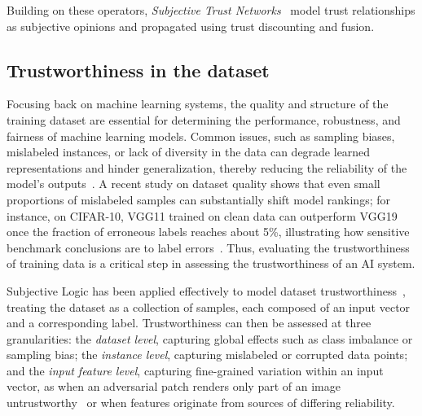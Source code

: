 Building on these operators, \emph{Subjective Trust Networks}~\cite{4622580,10.1007/978-3-032-08887-1_4} model trust relationships as subjective opinions and propagated using trust discounting and fusion. 

\vspace{-0.5em}
\subsection{Trustworthiness in the dataset}\label{sec:backtwdt}

Focusing back on machine learning systems, the quality and structure of the training dataset are essential for determining the performance, robustness, and fairness of machine learning models. Common issues, such as sampling biases, mislabeled instances, or lack of diversity in the data can degrade learned representations and hinder generalization, thereby reducing the reliability of the model’s outputs~\cite{arp2021dosdontsmachinelearning}. A recent study on dataset quality shows that even small proportions of mislabeled samples can substantially shift model rankings; for instance, on CIFAR-10, VGG11 trained on clean data can outperform VGG19 once the fraction of erroneous labels reaches about 5\%, illustrating how sensitive benchmark conclusions are to label errors~\cite{northcutt2021pervasivelabelerrorstest}. Thus, evaluating the trustworthiness of training data is a critical step in assessing the trustworthiness of an AI system. 

Subjective Logic has been applied effectively to model dataset trustworthiness~\cite{10.1007/978-3-032-19096-3_17,trust-aidatatrust}, treating the dataset as a collection of samples, each composed of an input vector and a corresponding label. Trustworthiness can then be assessed at three granularities: the \emph{dataset level}, capturing global effects such as class imbalance or sampling bias; the \emph{instance level}, capturing mislabeled or corrupted data points; and the \emph{input feature level}, capturing fine-grained variation within an input vector, as when an adversarial patch renders only part of an image untrustworthy~\cite{Vargas2020} or when features originate from sources of differing reliability.
